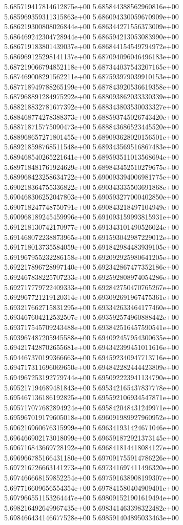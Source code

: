 5.685719417814612875e+00
5.685844388562960816e+00
5.685969359311315863e+00
5.686094330059670909e+00
5.686219300808026844e+00
5.686344271556373009e+00
5.686469242304728944e+00
5.686594213053083990e+00
5.686719183801439037e+00
5.686844154549794972e+00
5.686969125298141137e+00
5.687094096046496183e+00
5.687219066794852118e+00
5.687344037543207165e+00
5.687469008291562211e+00
5.687593979039910153e+00
5.687718949788265199e+00
5.687843920536619358e+00
5.687968891284975292e+00
5.688093862033330339e+00
5.688218832781677392e+00
5.688343803530033327e+00
5.688468774278388373e+00
5.688593745026743420e+00
5.688718715775090473e+00
5.688843686523445520e+00
5.688968657271801455e+00
5.689093628020156501e+00
5.689218598768511548e+00
5.689343569516867483e+00
5.689468540265221641e+00
5.689593511013568694e+00
5.689718481761924629e+00
5.689843452510279675e+00
5.689968423258634722e+00
5.690093394006981775e+00
5.690218364755336822e+00
5.690343335503691868e+00
5.690468306252047803e+00
5.690593277000402850e+00
5.690718247748750791e+00
5.690843218497104949e+00
5.690968189245459996e+00
5.691093159993815931e+00
5.691218130742170977e+00
5.691343101490526024e+00
5.691468072238873965e+00
5.691593042987229012e+00
5.691718013735584059e+00
5.691842984483939105e+00
5.691967955232286158e+00
5.692092925980641205e+00
5.692217896728997140e+00
5.692342867477352186e+00
5.692467838225707233e+00
5.692592808974054286e+00
5.692717779722409333e+00
5.692842750470765267e+00
5.692967721219120314e+00
5.693092691967475361e+00
5.693217662715831295e+00
5.693342633464177460e+00
5.693467604212532507e+00
5.693592574960888442e+00
5.693717545709243488e+00
5.693842516457590541e+00
5.693967487205945588e+00
5.694092457954300635e+00
5.694217428702655681e+00
5.694342399451011616e+00
5.694467370199366663e+00
5.694592340947713716e+00
5.694717311696069650e+00
5.694842282444423809e+00
5.694967253192779744e+00
5.695092223941134790e+00
5.695217194689481843e+00
5.695342165437837778e+00
5.695467136186192825e+00
5.695592106934547871e+00
5.695717077682894924e+00
5.695842048431249971e+00
5.695967019179605018e+00
5.696091989927960952e+00
5.696216960676315999e+00
5.696341931424671046e+00
5.696466902173018099e+00
5.696591872921373145e+00
5.696716843669728192e+00
5.696841814418084127e+00
5.696966785166431180e+00
5.697091755914786226e+00
5.697216726663141273e+00
5.697341697411496320e+00
5.697466668159852254e+00
5.697591638908199307e+00
5.697716609656554354e+00
5.697841580404909401e+00
5.697966551153264447e+00
5.698091521901619494e+00
5.698216492649967435e+00
5.698341463398322482e+00
5.698466434146677528e+00
5.698591404895033463e+00
